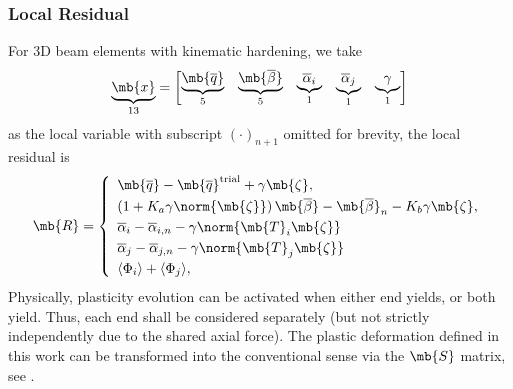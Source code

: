 \subsubsection{Local Residual}
For 3D beam elements with kinematic hardening, we take
\begin{gather}
\underbrace{\mb{x}}_{13}=\begin{bmatrix}
\underbrace{\mb{\overline{q}}}_{5}&
\underbrace{\mb{\overline{\beta}}}_{5}&
\underbrace{\overline{\alpha}_i}_{1}&
\underbrace{\overline{\alpha}_j}_{1}&
\underbrace{\gamma}_{1}
\end{bmatrix}
\end{gather}
as the local variable with subscript $\left(\cdot\right)_{n+1}$ omitted for brevity, the local residual is
\begin{gather}\label{eq:nm_residual}
\mb{R}=\left\{
\begin{array}{l}
\mb{\overline{q}}-\mb{\overline{q}}^\text{trial}+\gamma\mb{\zeta},\\[1mm]
\left(1+K_a\gamma\norm{\mb{\zeta}}\right)\mb{\overline{\beta}}-\mb{\overline{\beta}}_{n}-K_b\gamma\mb{\zeta},\\[1mm]
\overline{\alpha}_{i}-\overline{\alpha}_{i,n}-\gamma\norm{\mb{T}_i\mb{\zeta}}\\[1mm]
\overline{\alpha}_{j}-\overline{\alpha}_{j,n}-\gamma\norm{\mb{T}_j\mb{\zeta}}\\[1mm]
\langle\Phi_{i}\rangle+\langle\Phi_{j}\rangle,
\end{array}
\right.
\end{gather}
Physically, plasticity evolution can be activated when either end yields, or both yield. Thus, each end shall be considered separately (but not strictly independently due to the shared axial force). The plastic deformation defined in this work can be transformed into the conventional sense via the $\mb{S}$ matrix, see .
